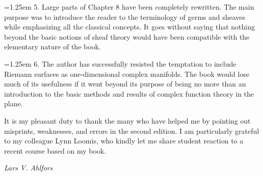 \par\hangindent=1.25em 5. Large parts of Chapter 8 have been completely rewritten. The main purpose was to introduce the reader to the terminology of germs and sheaves while emphasizing all the classical concepts. It goes without saying that nothing beyond the basic notions of sheaf theory would have been compatible with the elementary nature of the book.

\par\hangindent=1.25em 6. The author has successfully resisted the temptation to include Riemann surfaces as one-dimensional complex manifolds. The book would lose much of its usefulness if it went beyond its purpose of being no more than an introduction to the basic methods and results of complex function theory in the plane.

It is my pleasant duty to thank the many who have helped me by pointing out misprints, weaknesses, and errors in the second edition. I am particularly grateful to my colleague Lynn Loomis, who kindly let me share student reaction to a recent course based on my book.

\begin{flushright}\textit{Lars V. Ahlfors}\end{flushright}

